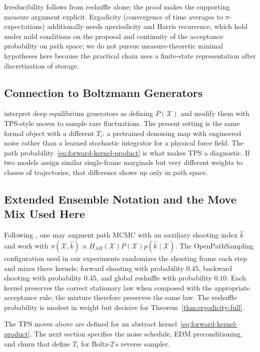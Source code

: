 \begin{remark}
Irreducibility follows from reshuffle alone; the proof makes the supporting measure argument explicit. Ergodicity (convergence of time averages to $\pi$-expectations) additionally needs aperiodicity and Harris recurrence, which hold under mild conditions on the proposal and continuity of the acceptance probability on path space; we do not pursue measure-theoretic minimal hypotheses here because the practical chain uses a finite-state representation after discretization of storage.
\end{remark}

\subsection{Connection to Boltzmann Generators}

\citet{falkner2023} interpret deep equilibrium generators as defining $P(\mathcal{X})$ and modify them with TPS-style moves to sample rare fluctuations. The present setting is the same formal object with a different $T_i$: a pretrained denoising map with engineered noise rather than a learned stochastic integrator for a physical force field. The path probability~\eqref{eq:forward-kernel-product} is what makes TPS a diagnostic. If two models assign similar single-frame marginals but very different weights to classes of trajectories, that difference shows up only in path space.

\subsection{Extended Ensemble Notation and the Move Mix Used Here}

Following \citet{falkner2023}, one may augment path MCMC with an auxiliary shooting index $\hat{k}$ and work with $\pi(\mathcal{X}, \hat{k}) \propto H_{AB}(\mathcal{X}) P(\mathcal{X}) p(\hat{k}\mid \mathcal{X})$. The OpenPathSampling configuration used in our experiments randomizes the shooting frame each step and mixes three kernels: forward shooting with probability $0.45$, backward shooting with probability $0.45$, and global reshuffle with probability $0.10$. Each kernel preserves the correct stationary law when composed with the appropriate acceptance rule; the mixture therefore preserves the same law. The reshuffle probability is modest in weight but decisive for Theorem~\ref{thm:ergodicity-full}.

The TPS moves above are defined for an abstract kernel~\eqref{eq:forward-kernel-product}.
The next section specifies the noise schedule, EDM preconditioning, and churn
that define $T_i$ for Boltz-2's reverse sampler.
